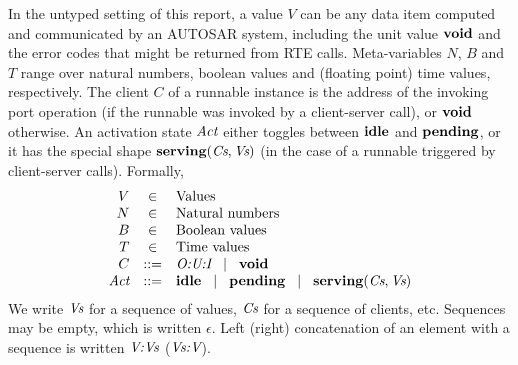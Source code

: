 \documentclass[twocolumn]{article}
\begin{document}
In the untyped setting of this report, a value $V$ can be any data item computed and communicated by an AUTOSAR system, including the unit value $\textbf{void}$ and the error codes that might be returned from RTE calls. Meta-variables $N$, $B$ and $T$ range over natural numbers, boolean values and (floating point) time values, respectively. The client $C$ of a runnable instance is the address of the invoking port operation (if the runnable was invoked by a client-server call), or $\textbf{void}$ otherwise. An activation state $\text{\it Act}$ either toggles between $\textbf{idle}$ and $\textbf{pending}$, or it has the special shape $\textbf{serving}(\text{\it Cs},\text{\it Vs})$ (in the case of a runnable triggered by client-server calls). Formally,
$$
\begin{array}{rcll}
	V	& \in		& \text{Values} \\
	N	& \in		& \text{Natural numbers} \\
	B	& \in		& \text{Boolean values} \\
	T	& \in		& \text{Time values} \\
	C	& ::=		& \emph{O:U:I} \hspace{2ex}|\hspace{2ex} \textbf{void} \\
	\text{\it Act}	& ::=		& \textbf{idle} \hspace{2ex}|\hspace{2ex} \textbf{pending} \hspace{2ex}|\hspace{2ex} \textbf{serving}(\text{\it Cs},\text{\it Vs}) \\
\end{array}
$$
We write $\text{\it Vs}$ for a sequence of values, $\text{\it Cs}$ for a sequence of clients, etc. Sequences may be empty, which is written $\epsilon$. Left (right) concatenation of an element with a sequence is written $\emph{V:Vs}$ ($\emph{Vs:V}$).
\end{document}
